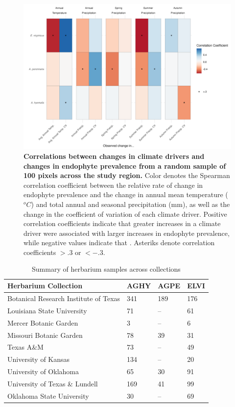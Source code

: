 \documentclass[11pt]{article}
\begin{document}
\begin{figure}[H]
	\centering
	\includegraphics[width = \linewidth]{climate_corr_heatmap_subsample.png}
	\caption{\textbf{Correlations between changes in climate drivers and changes in endophyte prevalence from a random sample of 100 pixels across the study region.} Color denotes the Spearman correlation coefficient between the relative rate of change in endophyte prevalence and the change in annual mean temperature ($^oC$) and total annual and seasonal precipitation (mm), as well as the change in the coefficient of variation of each climate driver. Positive correlation coefficients indicate that greater increases in a climate driver were associated with larger increases in endophyte prevalence, while negative values indicate that . Asteriks denote correlation coefficients $> .3$ or $< -.3$.}
\end{figure}


	
	\begin{table}[h]
		\caption{Summary of herbarium samples across collections}
		\label{Table:herbaria}
		\centering
		\begin{tabular}{llll}\hline
			Herbarium Collection        & AGHY        & AGPE      &      ELVI\\ \hline
			Botanical Research Institute of Texas &   341   &    189&    176    \\
			Louisiana State University &     71  & --  &   61       \\
			Mercer Botanic Garden &   3    & --     &     6\\
			Missouri Botanic Garden& 78 & 39& 31\\
		    Texas A\&M &  73&-- & 49 \\
		    University of Kansas & 134 & -- &  20\\
		    University of Oklahoma & 65 &30&  91\\
		    University of Texas  \& Lundell   &  169& 41& 99\\		    				 			     			     
			Oklahoma State University&     30  &   --    &  69 \\ \hline
		\end{tabular}
		\bigskip{}

	\end{table}
	
\end{document}
